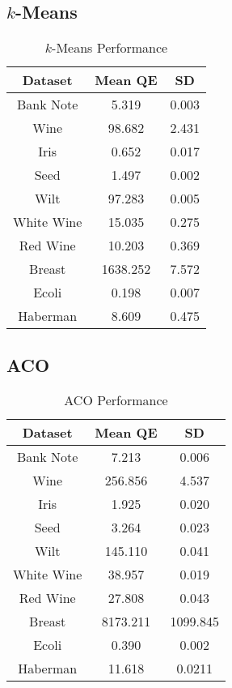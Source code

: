 \documentclass[conference]{IEEEtran}
\begin{document}
\subsection{$k$-Means}

\begin{table}[h]
  \caption{$k$-Means Performance}
  \resizebox{1.3\textwidth}{!} {\begin{minipage}{\textwidth}
      
      \begin{tabular}{ c |c | c }
        Dataset & Mean QE & SD \\ \hline
        Bank Note & 5.319 &    0.003 \\
        Wine & 98.682 &     2.431 \\
        Iris & 0.652 &   0.017 \\
        Seed & 1.497 &    0.002 \\
        Wilt & 97.283 &    0.005 \\
        White Wine & 15.035 &   0.275 \\
        Red Wine & 10.203 &      0.369 \\
        Breast & 1638.252 &  7.572 \\
        Ecoli & 0.198 &  0.007 \\
        Haberman & 8.609 &    0.475
      \end{tabular}

      \label{table:kmError}
  \end{minipage} }
\end{table}

\newpage
\subsection{ACO}

  \begin{table}[h]
  \caption{ACO Performance}
  \resizebox{1.3\textwidth}{!} {\begin{minipage}{\textwidth}
      
      \begin{tabular}{ c |c | c }
        Dataset & Mean QE & SD \\ \hline
        Bank Note & 7.213 &       0.006 \\
        Wine & 256.856 &     4.537   \\
        Iris & 1.925 &       0.020 \\
        Seed & 3.264 &       0.023 \\
        Wilt & 145.110 &     0.041 \\
        White Wine & 38.957 &     0.019 \\
        Red Wine & 27.808 &       0.043 \\
        Breast & 8173.211 &  1099.845   \\
        Ecoli & 0.390 &      0.002 \\
        Haberman & 11.618 &     0.0211
      \end{tabular}

      \label{table:acoError}
  \end{minipage} }
  \end{table}
\end{document}
